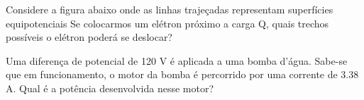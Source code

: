 \documentclass[12pt, addpoints]{exam}
\begin{document}
\begin{questions}
\begin{multicols*}{2}
\begin{oneparchoices}
\end{oneparchoices}
\question[20] Considere a figura abaixo onde as linhas trajeçadas representam superfícies equipotenciais Se colocarmos um elétron próximo a carga Q, quais trechos possíveis o elétron poderá se deslocar?
        
        \begin{center}
            \begin{minipage}[c]{0.5\linewidth}
            \end{minipage}
        \end{center}
        
        

\begin{oneparchoices}
\end{oneparchoices}
\question[20] Uma diferença de potencial de 120 V é aplicada a uma bomba d’água. Sabe-se que em funcionamento, o motor da bomba é percorrido por uma corrente de    3.38 A. Qual é a potência desenvolvida nesse motor?


\end{multicols*}
\end{questions}
\end{document}
